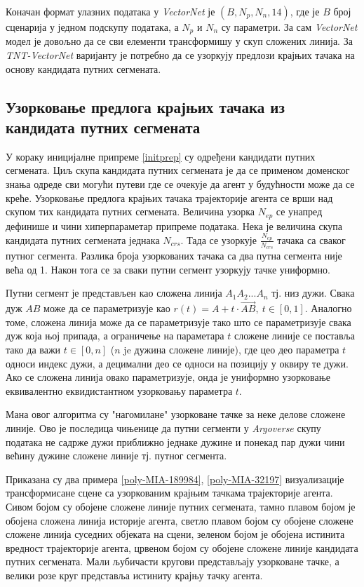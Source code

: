 \documentclass[11pt,oneside]{memoir}
\begin{document}
Коначан формат улазних података у \textit{VectorNet} је $(B, N_{p}, N_{n}, 14)$, где је $B$ број сценарија у једном подскупу података,
а $N_{p}$ и $N_{n}$ су параметри. За сам \textit{VectorNet} модел је довољно да се сви елементи трансформишу у скуп сложених линија. За
\textit{TNT-VectorNet} варијанту је потребно да се узоркују предлози крајњих тачака на основу кандидата путних сегмената. 

\subsection{Узорковање предлога крајњих тачака из кандидата путних сегмената}

У кораку иницијалне припреме \ref{initprep} су одређени кандидати путних сегмената. Циљ скупа кандидата путних сегмената је да се применом доменског знања
одреде сви могући путеви где се очекује да агент у будућности може да се креће. Узорковање предлога крајњих тачака трајекторије агента се врши над
скупом тих кандидата путних сегмената. Величина узорка $N_{ep}$ се унапред дефинише и чини хиперпараметар припреме података. Нека је величина скупа
кандидата путних сегмената једнака $N_{crs}$. Тада се узоркује $\frac{N_{ep}}{N_{crs}}$ тачака са сваког путног сегмента. Разлика броја
узоркованих тачака са два путна сегмента није већа од 1. Након тога се за сваки путни сегмент узоркују тачке униформно. 

Путни сегмент је представљен као сложена линија $A_{1}A_{2}...A_{n}$ тј. низ дужи. Свака дуж $AB$ може да се параметризује као 
$r(t) = A + t\cdot \vec{AB},\ t \in [0, 1]$. Аналогно томе, сложена линија може да се параметризује тако што се параметризује свака дуж која њој припада,
а ограничење на параметара $t$ сложене линије се поставља тако да важи $t \in [0, n]$ ($n$ je дужина сложене линије), где цео део параметра $t$ односи индекс дужи, а децимални
део се односи на позицију у оквиру те дужи. Ако се сложена линија овако параметризује, онда је униформно узорковање еквивалентно еквидистантном узорковању
параметра $t$. 

Мана овог алгоритма су "нагомилане" узорковане тачке за неке делове сложене линије. Ово је последица чињенице да путни сегменти у \textit{Argoverse} 
скупу података не садрже дужи приближно једнаке дужине и понекад пар дужи чини већину дужине сложене линије тј. путног сегмента. 

Приказана су два примера \ref{poly-MIA-189984}, \ref{poly-MIA-32197} визуализације трансформисане сцене са узоркованим крајњим тачкама трајекторије агента.
Сивом бојом су обојене сложене линије путних сегмената, тамно плавом бојом је обојена сложена линија историје агента, светло плавом бојом су обојене сложене 
сложене линија суседних објеката на сцени, зеленом бојом је обојена истинита вредност трајекторије агента, црвеном бојом су обојене сложене линије
кандидата путних сегмената. Мали љубичасти кругови представљају узорковане тачке, а велики розе круг представља истиниту крајњу тачку агента.
\end{document}
